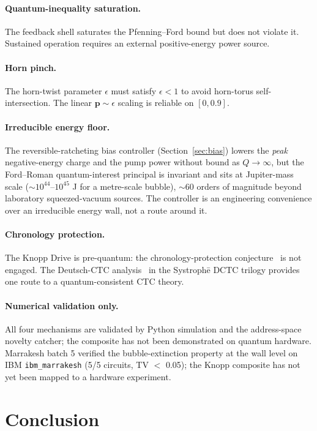 \documentclass[11pt,a4paper]{article}
\begin{document}
\paragraph{Quantum-inequality saturation.} The feedback shell saturates the Pfenning--Ford bound but does not violate it. Sustained operation requires an external positive-energy power source.

\paragraph{Horn pinch.} The horn-twist parameter $\epsilon$ must satisfy $\epsilon<1$ to avoid horn-torus self-intersection. The linear $\bm{p}\sim\epsilon$ scaling is reliable on $[0,0.9]$.

\paragraph{Irreducible energy floor.} The reversible-ratcheting bias controller (Section~\ref{sec:bias}) lowers the \emph{peak} negative-energy charge and the pump power without bound as $Q\to\infty$, but the Ford--Roman quantum-interest principal is invariant and sits at Jupiter-mass scale ($\sim10^{44}$--$10^{45}$ J for a metre-scale bubble), $\sim60$ orders of magnitude beyond laboratory squeezed-vacuum sources. The controller is an engineering convenience over an irreducible energy wall, not a route around it.

\paragraph{Chronology protection.} The Knopp Drive is pre-quantum: the chronology-protection conjecture~\cite{Hawking1992} is not engaged. The Deutsch-CTC analysis~\cite{Deutsch1991} in the Systroph\=e DCTC trilogy provides one route to a quantum-consistent CTC theory.

\paragraph{Numerical validation only.} All four mechanisms are validated by Python simulation and the address-space novelty catcher; the composite has not been demonstrated on quantum hardware. Marrakesh batch 5 verified the bubble-extinction property at the wall level on IBM \texttt{ibm\_marrakesh} (5/5 circuits, TV $<$ 0.05); the Knopp composite has not yet been mapped to a hardware experiment.

\section{Conclusion}
\end{document}
